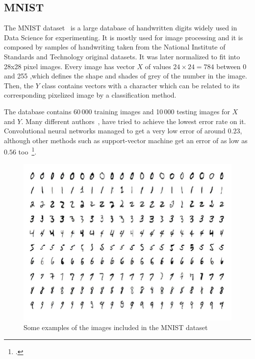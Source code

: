 \subsection{MNIST}
\label{subsec:MNIST}


The MNIST dataset~\cite{MNIST} is a large database of handwritten digits widely used in Data Science for experimenting. It is mostly used for image processing and it is composed by samples of handwriting taken from the National Institute of Standards and Technology original datasets. It was later normalized to fit into 28x28 pixel images. Every image has vector $X$ of values $24 \times 24 = 784$ between 0 and 255 ,which defines the shape and shades of grey of the number in the image. Then, the $Y$ class contains vectors with a character which can be related to its corresponding pixelized image by a classification method. \par

The database contains 60\,000 training images and 10\,000 testing images for $X$ and $Y$. Many different authors~\cite{MNIST_classification_example}, have tried to achieve the lowest error rate on it. Convolutional neural networks managed to get a very low error of around $0.23$, although other methods such as support-vector machine get an error of as low as $0.56$ too~\footcite{wiki:MNIST}.
%
\begin{figure}[H]
\centering
  \includegraphics[width=16cm]{Figuras_tfg/Figure_MNIST}
  \caption{Some examples of the images included in the MNIST dataset}
 \label{fig:figure_MNIST}
\end{figure}

